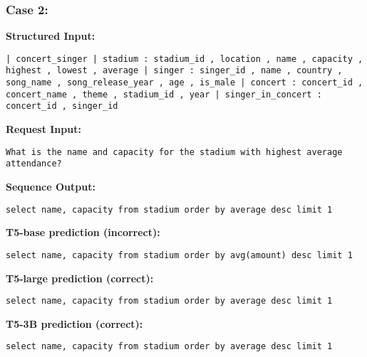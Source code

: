 \documentclass[11pt]{article}
\begin{document}
\subsubsection{Case 2:}
\textbf{Structured Input:} 
\begin{lstlisting}
| concert_singer | stadium : stadium_id , location , name , capacity , highest , lowest , average | singer : singer_id , name , country , song_name , song_release_year , age , is_male | concert : concert_id , concert_name , theme , stadium_id , year | singer_in_concert : concert_id , singer_id
\end{lstlisting}
\textbf{Request Input:} 
\begin{lstlisting}
What is the name and capacity for the stadium with highest average attendance?
\end{lstlisting}
\textbf{Sequence Output:} 
\begin{lstlisting}
select name, capacity from stadium order by average desc limit 1
\end{lstlisting}
\textbf{T5-base prediction (incorrect):} 
\begin{lstlisting}
select name, capacity from stadium order by avg(amount) desc limit 1
\end{lstlisting}
\textbf{T5-large prediction (correct):} 
\begin{lstlisting}
select name, capacity from stadium order by average desc limit 1
\end{lstlisting}
\textbf{T5-3B prediction (correct):} 
\begin{lstlisting}
select name, capacity from stadium order by average desc limit 1
\end{lstlisting}
\end{document}
